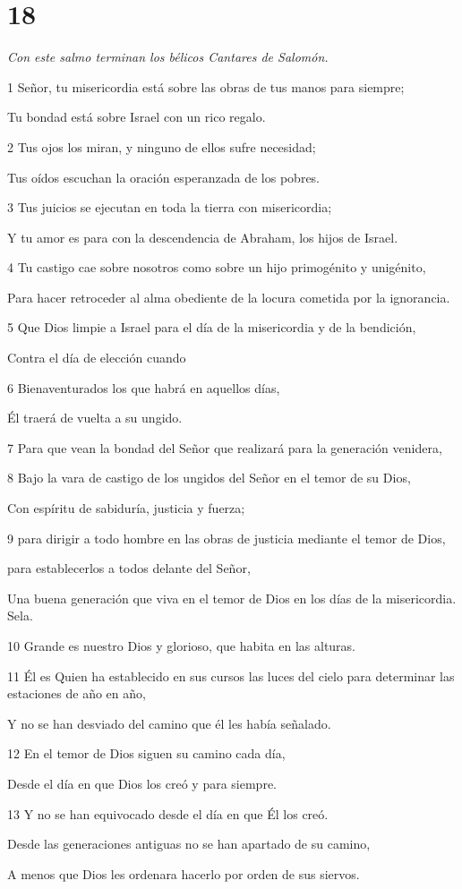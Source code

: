 \chapter{18}

\par \textit{Con este salmo terminan los bélicos Cantares de Salomón.}

\par 1 Señor, tu misericordia está sobre las obras de tus manos para siempre;
\par     Tu bondad está sobre Israel con un rico regalo.
\par 2 Tus ojos los miran, y ninguno de ellos sufre necesidad;
\par     Tus oídos escuchan la oración esperanzada de los pobres.
\par 3 Tus juicios se ejecutan en toda la tierra con misericordia;
\par     Y tu amor es para con la descendencia de Abraham, los hijos de Israel.
\par 4 Tu castigo cae sobre nosotros como sobre un hijo primogénito y unigénito,
\par     Para hacer retroceder al alma obediente de la locura cometida por la ignorancia.
\par 5 Que Dios limpie a Israel para el día de la misericordia y de la bendición,
\par     Contra el día de elección cuando
\par 6 Bienaventurados los que habrá en aquellos días,
\par     Él traerá de vuelta a su ungido.
\par 7 Para que vean la bondad del Señor que realizará para la generación venidera,
\par 8 Bajo la vara de castigo de los ungidos del Señor en el temor de su Dios,
\par     Con espíritu de sabiduría, justicia y fuerza;
\par 9 para dirigir a todo hombre en las obras de justicia mediante el temor de Dios,
\par     para establecerlos a todos delante del Señor,
\par     Una buena generación que viva en el temor de Dios en los días de la misericordia. Sela.
\par   
\par 10 Grande es nuestro Dios y glorioso, que habita en las alturas.
\par 11 Él es Quien ha establecido en sus cursos las luces del cielo para determinar las estaciones de año en año,
\par     Y no se han desviado del camino que él les había señalado.
\par 12 En el temor de Dios siguen su camino cada día,
\par     Desde el día en que Dios los creó y para siempre.
\par 13 Y no se han equivocado desde el día en que Él los creó.
\par     Desde las generaciones antiguas no se han apartado de su camino,
\par     A menos que Dios les ordenara hacerlo por orden de sus siervos.


